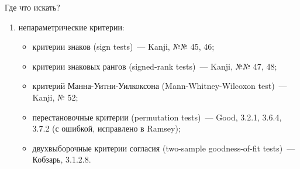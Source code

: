 \documentclass[11pt,pdf,utf8,hyperref={unicode},aspectratio=169]{beamer}
\begin{document}
\begin{frame}[allowframebreaks]{Где что искать?}
\begin{enumerate}
        \item непараметрические критерии:
        \begin{itemize}
            \item критерии знаков (sign tests)~--- Kanji, №№ 45, 46;
            \item критерии знаковых рангов (signed-rank tests)~--- Kanji, №№ 47, 48;
            \item критерий Манна-Уитни-Уилкоксона (Mann-Whitney-Wilcoxon test)~--- Kanji, № 52;
            \item перестановочные критерии (permutation tests)~--- Good, 3.2.1, 3.6.4, 3.7.2 (с ошибкой, исправлено в Ramsey);
            \item двухвыборочные критерии согласия (two-sample goodness-of-fit tests)~--- Кобзарь, 3.1.2.8.
        \end{itemize}
      \end{enumerate}

    \end{frame}
\end{document}
